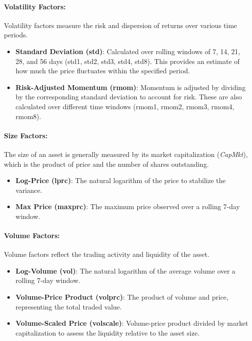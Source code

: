 \documentclass{article}
\begin{document}
\paragraph{Volatility Factors:}
Volatility factors measure the risk and dispersion of returns over various time periods.
\begin{itemize}
    \item \textbf{Standard Deviation (std)}: Calculated over rolling windows of 7, 14, 21, 28, and 56 days (std1, std2, std3, std4, std8). This provides an estimate of how much the price fluctuates within the specified period.
    \item \textbf{Risk-Adjusted Momentum (rmom)}: Momentum is adjusted by dividing by the corresponding standard deviation to account for risk. These are also calculated over different time windows (rmom1, rmom2, rmom3, rmom4, rmom8).
\end{itemize}

\paragraph{Size Factors:}
The size of an asset is generally measured by its market capitalization (\textit{CapMkt}), which is the product of price and the number of shares outstanding.
\begin{itemize}
    \item \textbf{Log-Price (lprc)}: The natural logarithm of the price to stabilize the variance.
    \item \textbf{Max Price (maxprc)}: The maximum price observed over a rolling 7-day window.
\end{itemize}

\paragraph{Volume Factors:}
Volume factors reflect the trading activity and liquidity of the asset.
\begin{itemize}
    \item \textbf{Log-Volume (vol)}: The natural logarithm of the average volume over a rolling 7-day window.
    \item \textbf{Volume-Price Product (volprc)}: The product of volume and price, representing the total traded value.
    \item \textbf{Volume-Scaled Price (volscale)}: Volume-price product divided by market capitalization to assess the liquidity relative to the asset size.
\end{itemize}
\end{document}
